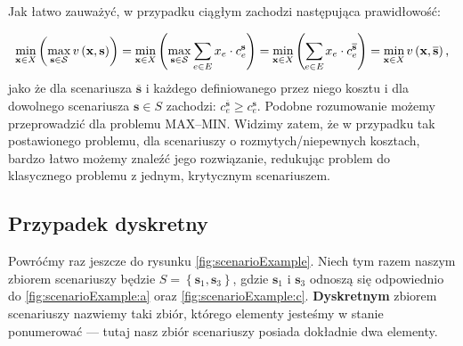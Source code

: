 Jak łatwo zauważyć, w przypadku ciągłym zachodzi następująca prawidłowość:

\begin{equation}
		\min_{ \mathclap{\textbf{x} \in X}} \left( \max_{ \mathclap{\textbf{s} \in \mathcal{S}}} v \left( \textbf{x}, \textbf{s} \right) \right) = \min_{ \mathclap{\textbf{x} \in X}} \left( \max_{ \mathclap{\textbf{s} \in \mathcal{S}}} \sum_{e \in E} x_{e} \cdot c^{\textbf{s}}_{e} \right) = \min_{ \mathclap{\textbf{x} \in X}} \left( \sum_{ \mathclap{e \in E}} x_{e} \cdot c^{\overline{\textbf{s}}}_{e} \right) = \min_{ \mathclap{\textbf{x} \in X}} v \left( \textbf{x}, \overline{\textbf{s}} \right) \text{,}
\end{equation}
jako że dla scenariusza $\overline{\textbf{s}}$ i każdego definiowanego przez niego kosztu i dla dowolnego scenariusza $\textbf{s} \in S$ zachodzi: $c^{\overline{\textbf{s}}}_{e} \geqslant c^{\textbf{s}}_{e}$. Podobne rozumowanie możemy przeprowadzić dla problemu \textsc{MAX--MIN}. Widzimy zatem, że w przypadku tak postawionego problemu, dla scenariuszy o rozmytych/niepewnych kosztach, bardzo łatwo możemy znaleźć jego rozwiązanie, redukując problem do klasycznego problemu z jednym, krytycznym scenariuszem.

\subsection{Przypadek dyskretny}

Powróćmy raz jeszcze do rysunku \ref{fig:scenarioExample}. Niech tym razem naszym zbiorem scenariuszy będzie $S = \left\{ \textbf{s}_{1}, \textbf{s}_{3} \right\}$, gdzie $\textbf{s}_{1}$ i $\textbf{s}_{3}$ odnoszą się odpowiednio do \ref{fig:scenarioExample:a} oraz \ref{fig:scenarioExample:c}. \textbf{Dyskretnym} zbiorem scenariuszy nazwiemy taki zbiór, którego elementy jesteśmy w stanie ponumerować --- tutaj nasz zbiór scenariuszy posiada dokładnie dwa elementy.


